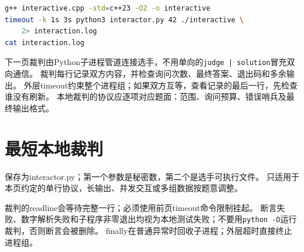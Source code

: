\begin{lstlisting}[language=bash]
g++ interactive.cpp -std=c++23 -O2 -o interactive
timeout -k 1s 3s python3 interactor.py 42 ./interactive \
    2> interaction.log
cat interaction.log
\end{lstlisting}
下一页裁判由Python子进程管道连接选手，不用单向的\texttt{judge | solution}冒充双向通信。
裁判每行记录双方内容，并检查询问次数、最终答案、退出码和多余输出。
外层timeout约束整个进程组；如果双方互等，查看记录的最后一行，先检查谁没有刷新。
本地裁判的协议应逐项对应题面：范围、询问预算、错误哨兵及最终输出格式。

\newpage
\section{最短本地裁判}
保存为interactor.py；第一个参数是秘密数，第二个是选手可执行文件。
只适用于本页约定的单行协议，长输出、并发交互或多组数据按题意调整。

裁判的readline会等待完整一行；必须使用前页timeout命令限制挂起。
断言失败、数字解析失败和子程序非零退出均视为本地测试失败；不要用\texttt{python -O}运行裁判，否则断言会被删除。
finally在普通异常时回收子进程；外层超时直接终止进程组。
